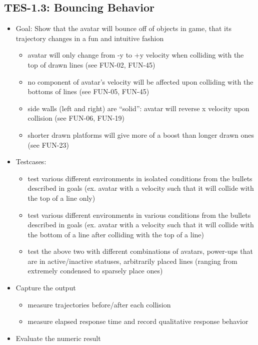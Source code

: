 \subsection{TES-1.3: Bouncing Behavior }
\begin{itemize}
\item Goal: Show that the avatar will bounce off of objects in game, that
its trajectory changes in a fun and intuitive fashion 

\begin{itemize}
\item avatar will only change from -y to +y velocity when colliding with
the top of drawn lines (see FUN-02, FUN-45) 
\item no component of avatar\textquoteright{}s velocity will be affected
upon colliding with the bottoms of lines (see FUN-05, FUN-45) 
\item side walls (left and right) are \textquotedblleft{}solid\textquotedblright{}:
avatar will reverse x velocity upon collision (see FUN-06, FUN-19) 
\item shorter drawn platforms will give more of a boost than longer drawn
ones (see FUN-23) 
\end{itemize}
\item Testcases: 

\begin{itemize}
\item test various different environments in isolated conditions from the
bullets described in goals (ex. avatar with a velocity such that it
will collide with the top of a line only) 
\item test various different environments in various conditions from the
bullets described in goals (ex. avatar with a velocity such that it
will collide with the bottom of a line after colliding with the top
of a line) 
\item test the above two with different combinations of avatars, power-ups
that are in active/inactive statuses, arbitrarily placed lines (ranging
from extremely condensed to sparsely place ones) 
\end{itemize}
\item Capture the output 

\begin{itemize}
\item measure trajectories before/after each collision 
\item measure elapsed response time and record qualitative response behavior 
\end{itemize}
\item Evaluate the numeric result 


\end{itemize}
